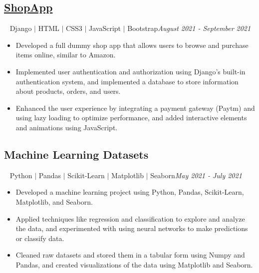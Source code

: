 \documentclass[12pt]{article}
\begin{document}
\subsection*{\href{https://akanksha2403.pythonanywhere.com/}{ShopApp}}~ Django $\vert$ HTML $\vert$ CSS3 $\vert$ JavaScript $\vert$ Bootstrap\hfill \textit{August 2021 - September 2021} \\ 
\begin{itemize}[topsep=0pt,itemsep=1pt,partopsep=1pt, parsep=1pt]
	\item Developed a full dummy shop app that allows users to browse and purchase items online, similar to Amazon.
	\item Implemented user authentication and authorization using Django's built-in authentication system, and implemented a database to store information about products, orders, and users.
	\item Enhanced the user experience by integrating a payment gateway (Paytm) and using lazy loading to optimize performance, and added interactive elements and animations using JavaScript.
\end{itemize}
\subsection*{Machine Learning Datasets}~ Python $\vert$ Pandas $\vert$ Scikit-Learn $\vert$ Matplotlib $\vert$ Seaborn\hfill \textit{May 2021 - July 2021} \\
\begin{itemize}[topsep=0pt,itemsep=1pt,partopsep=1pt, parsep=1pt]
	\item Developed a machine learning project using Python, Pandas, Scikit-Learn, Matplotlib, and Seaborn.
	\item Applied techniques like regression and classification to explore and analyze the data, and experimented with using neural networks to make predictions or classify data.
	\item Cleaned raw datasets and stored them in a tabular form using Numpy and Pandas, and created visualizations of the data using Matplotlib and Seaborn.
\end{itemize}
\end{document}
